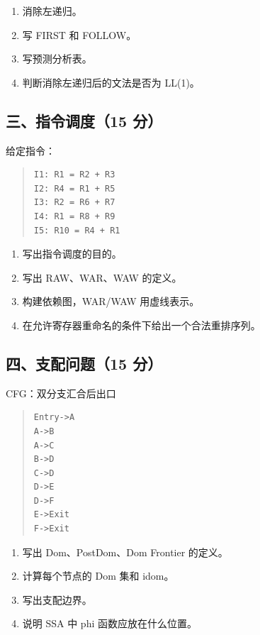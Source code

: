 \documentclass[UTF8,zihao=-4]{ctexart}
\begin{document}
\begin{enumerate}
\item 消除左递归。
\item 写 FIRST 和 FOLLOW。
\item 写预测分析表。
\item 判断消除左递归后的文法是否为 LL(1)。
\end{enumerate}


\subsection{三、指令调度（15 分）}


给定指令：


\begin{quote}
\footnotesize
\begin{verbatim}
I1: R1 = R2 + R3
I2: R4 = R1 + R5
I3: R2 = R6 + R7
I4: R1 = R8 + R9
I5: R10 = R4 + R1
\end{verbatim}
\end{quote}


\begin{enumerate}
\item 写出指令调度的目的。
\item 写出 RAW、WAR、WAW 的定义。
\item 构建依赖图，WAR/WAW 用虚线表示。
\item 在允许寄存器重命名的条件下给出一个合法重排序列。
\end{enumerate}


\subsection{四、支配问题（15 分）}


CFG：双分支汇合后出口


\begin{quote}
\footnotesize
\begin{verbatim}
Entry->A
A->B
A->C
B->D
C->D
D->E
D->F
E->Exit
F->Exit
\end{verbatim}
\end{quote}


\begin{enumerate}
\item 写出 Dom、PostDom、Dom Frontier 的定义。
\item 计算每个节点的 Dom 集和 idom。
\item 写出支配边界。
\item 说明 SSA 中 phi 函数应放在什么位置。
\end{enumerate}
\end{document}
